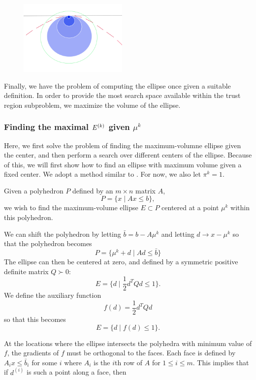 \begin{figure}[h]
    \centering
    \includegraphics[width=200px]{images/second_order_critical_point.png}
    \label{fbns}
\end{figure}



Finally, we have the problem of computing the ellipse once given a suitable definition.
In order to provide the most search space available within the trust region subproblem, we maximize the volume of the ellipse.

\subsubsection{Finding the maximal $ {E^{(k)}} $ given $\mu^k$}

\label{ellipse_optimization}

Here, we first solve the problem of finding the maximum-volumne ellipse given the center, and then perform a search over different centers of the ellipse.
Because of this, we will first show how to find an ellipse with maximum volume given a fixed center.
We adopt a method similar to \cite{Khachiyan1993}.
For now, we also let $\pi^k = 1$.

Given a polyhedron $P$ defined by an $m \times n$ matrix $A$,
\[
P = \{ x \; | \;  Ax \le b \},
\]
we wish to find the maximum-volume ellipse $E \subset P$ centered at a point $\mu^{k}$ within this polyhedron.

We can shift the polyhedron by letting $\bar{b} = b - A\mu^{k}$ and letting $d \to x - \mu^{k}$ so that the polyhedron becomes
\[
P = \{ \mu^k + d \; | \;  Ad \le \bar{b} \}
\]
The ellipse can then be centered at zero, and defined by a symmetric positive definite matrix $Q \succ 0$:
\[
E = \{ d \; | \; \frac 1 2 d^T Q d \le 1 \}.
\]
We define the auxiliary function 
\[
f(d) = \frac 1 2 d^T Q d
\]
so that this becomes
\[
E = \{ d \; | \; f(d) \le 1 \}.
\]

At the locations where the ellipse intersects the polyhedra with minimum value of $f$, the gradients of $f$ must be orthogonal to the faces.
Each face is defined by $A_i x \le \bar{b}_i$ for some $i$ where $A_i$ is the $i$th row of $A$ for $1\le i \le m$.
This implies that if $d^{(i)}$ is such a point along a face, then

